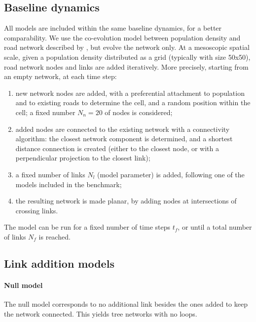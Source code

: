 \documentclass{article}
\begin{document}
\subsection{Baseline dynamics}

All models are included within the same baseline dynamics, for a better comparability. We use the co-evolution model between population density and road network described by \cite{raimbault2019urban}, but evolve the network only. At a mesoscopic spatial scale, given a population density distributed as a grid (typically with size 50x50), road network nodes and links are added iteratively. More precisely, starting from an empty network, at each time step:

\begin{enumerate}
	\item new network nodes are added, with a preferential attachment to population and to existing roads to determine the cell, and a random position within the cell; a fixed number $N_n = 20$ of nodes is considered;
	\item added nodes are connected to the existing network with a connectivity algorithm: the closest network component is determined, and a shortest distance connection is created (either to the closest node, or with a perpendicular projection to the closest link);
	\item a fixed number of links $N_l$ (model parameter) is added, following one of the models included in the benchmark;
	\item the resulting network is made planar, by adding nodes at intersections of crossing links. 
\end{enumerate}

The model can be run for a fixed number of time steps $t_f$, or until a total number of links $N_f$ is reached.

\subsection{Link addition models}

\paragraph{Null model}

The null model corresponds to no additional link besides the ones added to keep the network connected. This yields tree networks with no loops.
\end{document}
